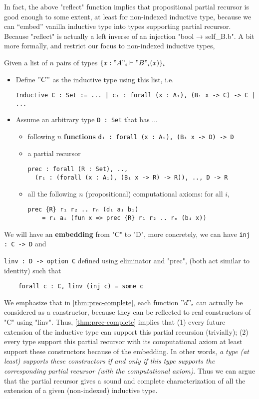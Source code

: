 In fact, the above "reflect" function implies that propositional partial recursor is good enough to some extent, at least for non-indexed inductive type, because we can ``embed'' vanilla inductive type into types supporting partial recursor. Because "reflect" is actually a left inverse of an injection "bool → self_B.b". A bit more formally, and restrict our focus to non-indexed inductive types,

\begin{theorem}\label{thm:prec-complete} Given a list of $n$ pairs of types $\{ x : "A"_i \vdash "B"_i(x) \}_{i}$
  \begin{itemize}
    \item Define $"C"$ as the inductive type using this list, i.e. 
    \begin{verbatim}
Inductive C : Set := ... | cᵢ : forall (x : Aᵢ), (Bᵢ x -> C) -> C | ...
    \end{verbatim}
    \item Assume an arbitrary type \texttt{D : Set} that has ...
    \begin{itemize}
      \item following $n$ \textbf{functions} \texttt{dᵢ : forall (x : Aᵢ), (Bᵢ x -> D) -> D}  
      \item a partial recursor 
      \begin{verbatim}
prec : forall (R : Set), ..,  
  (rᵢ : (forall (x : Aᵢ), (Bᵢ x -> R) -> R)), .., D -> R
      \end{verbatim}
      \item all the following $n$ (propositional) computational axioms: for all $i$, 
      \begin{verbatim}
prec {R} r₁ r₂ .. rₙ (dᵢ aᵢ bᵢ) 
    = rᵢ aᵢ (fun x => prec {R} r₁ r₂ .. rₙ (bᵢ x))
      \end{verbatim}
    \end{itemize}
  \end{itemize}
  We will have an \textbf{embedding} from "C" to "D", more concretely, we can have \texttt{inj : C -> D} and 

  \texttt{linv : D -> option C} defined using eliminator and "prec", (both act similar to identity) such that
  \begin{verbatim}
    forall c : C, linv (inj c) = some c
  \end{verbatim}
\end{theorem}

We emphasize that in \cref{thm:prec-complete}, each function $"d"_i$ can actually be considered as a constructor, because they can be reflected to real constructors of "C" using "linv". Thus, \cref{thm:prec-complete} implies that (1) every future extension of the inductive type can support this partial recursion (trivially); (2) every type support this partial recursor with its computational axiom at least support these constructors because of the embedding. In other words, \textit{a type (at least) supports these constructors if and only if this type supports the corresponding partial recursor (with the computational axiom)}.  Thus we can argue that the partial recursor gives a sound and complete characterization of all the extension of a given (non-indexed) inductive type.

